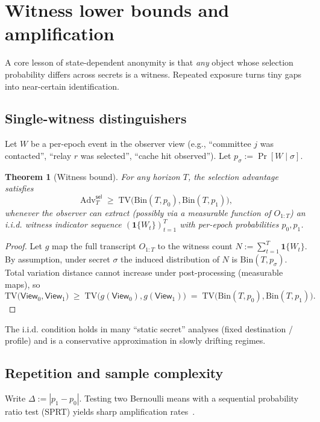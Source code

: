 \documentclass[11pt]{article}
\newtheorem{theorem}{Theorem}
\newcommand{\Adv}{\mathrm{Adv}}
\newcommand{\TV}{\mathrm{TV}}
\begin{document}
\section{Witness lower bounds and amplification}
\label{sec:lower}

A core lesson of state-dependent anonymity is that \emph{any} object whose selection probability differs across secrets is a witness.
Repeated exposure turns tiny gaps into near-certain identification.

\subsection{Single-witness distinguishers}
\label{sec:witness}
Let $W$ be a per-epoch event in the observer view (e.g., ``committee $j$ was contacted'', ``relay $r$ was selected'', ``cache hit observed'').
Let $p_\sigma := \Pr[W\mid \sigma]$.

\begin{theorem}[Witness bound]
\label{thm:sel-witness}
For any horizon $T$, the selection advantage satisfies
\[
\Adv^{\mathsf{sel}}_T \;\ge\; \TV\big(\mathrm{Bin}(T,p_0),\mathrm{Bin}(T,p_1)\big),
\]
whenever the observer can extract (possibly via a measurable function of $O_{1:T}$) an i.i.d. witness indicator sequence $(\mathbf{1}\{W_t\})_{t=1}^T$ with per-epoch probabilities $p_0,p_1$.
\end{theorem}

\begin{proof}
Let $g$ map the full transcript $O_{1:T}$ to the witness count $N:=\sum_{t=1}^T \mathbf{1}\{W_t\}$.
By assumption, under secret $\sigma$ the induced distribution of $N$ is $\mathrm{Bin}(T,p_\sigma)$.
Total variation distance cannot increase under post-processing (measurable maps), so
\[\TV\big(\mathsf{View}_0,\mathsf{View}_1\big)\;\ge\;\TV\big(g(\mathsf{View}_0),g(\mathsf{View}_1)\big)\;=\;\TV\big(\mathrm{Bin}(T,p_0),\mathrm{Bin}(T,p_1)\big).\]
\end{proof}

The i.i.d. condition holds in many ``static secret'' analyses (fixed destination / profile) and is a conservative approximation in slowly drifting regimes.

\subsection{Repetition and sample complexity}
\label{sec:amplification}
Write $\Delta := |p_1-p_0|$.
Testing two Bernoulli means with a sequential probability ratio test (SPRT) yields sharp amplification rates~\cite{wald_sprt_1945,howard2021confseq}.
\end{document}

